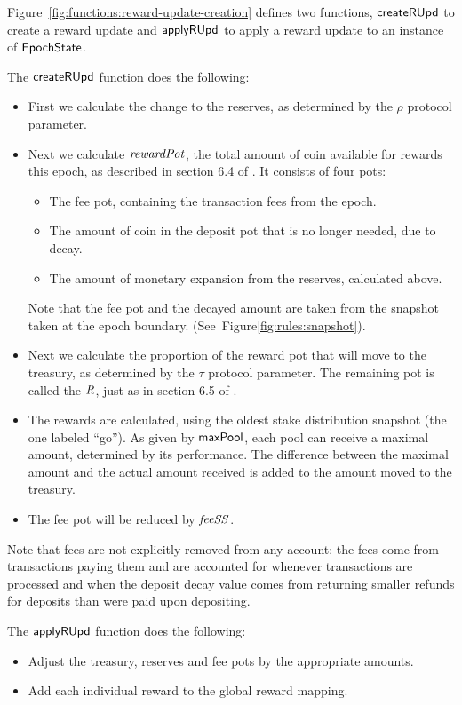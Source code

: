 \clearpage

Figure~\ref{fig:functions:reward-update-creation} defines two functions,
$\mathsf{createRUpd}$ to create a reward update and $\mathsf{applyRUpd}$ to apply a
reward update to an instance of $\mathsf{EpochState}$.

The $\mathsf{createRUpd}$ function does the following:
\begin{itemize}
  \item First we calculate the change to the reserves,
    as determined by the $\rho$ protocol parameter.
  \item Next we calculate $\mathit{rewardPot}$, the total amount of coin available for rewards this
    epoch, as described in section 6.4 of \cite{delegation_design}. It consists of four pots:
    \begin{itemize}
      \item The fee pot, containing the transaction fees from the epoch.
      \item The amount of coin in the deposit pot that is no longer needed, due to decay.
      \item The amount of monetary expansion from the reserves, calculated above.
    \end{itemize}
    Note that the fee pot and the decayed amount are taken from the snapshot taken at the
    epoch boundary.  (See~Figure\ref{fig:rules:snapshot}).
  \item Next we calculate the proportion of the reward pot that will move to the treasury,
    as determined by the $\tau$ protocol parameter. The remaining pot is called the
    $\mathit{R}$, just as in section 6.5 of \cite{delegation_design}.
  \item The rewards are calculated, using the oldest stake distribution snapshot (the one
    labeled ``go'').
    As given by $\mathsf{maxPool}$, each pool can receive a maximal amount, determined by its
    performance.  The difference between the maximal amount and the actual amount received is
    added to the amount moved to the treasury.
  \item The fee pot will be reduced by $\mathit{feeSS}$.
\end{itemize}

Note that fees are not explicitly removed from any account:
the fees come from transactions paying them and are accounted for whenever
transactions are processed and when the deposit decay value comes from returning
smaller refunds for deposits than were paid upon depositing.

The $\mathsf{applyRUpd}$ function does the following:
    \begin{itemize}
      \item Adjust the treasury, reserves and fee pots by the appropriate amounts.
      \item Add each individual reward to the global reward mapping.
    \end{itemize}

